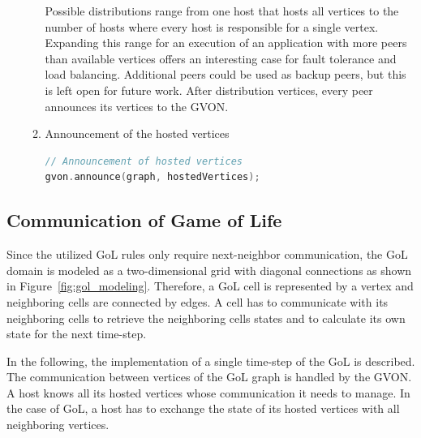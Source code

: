 \begin{enumerate}
\begin{enumerate}
  \noindent Possible distributions range from one host that hosts all
  vertices to the number of hosts where every host is responsible for
  a single vertex. Expanding this range for an execution of an
  application with more peers than available vertices offers an
  interesting case for fault tolerance and load balancing.  Additional
  peers could be used as backup peers, but this is left open for
  future work.  After distribution vertices, every peer announces its
  vertices to the GVON.

\item Announcement of the hosted vertices

  \begin{minipage}[t]{\textwidth} 
  \begin{lstlisting}[language=C++, label=lst:gol_announce, caption={}]
// Announcement of hosted vertices
gvon.announce(graph, hostedVertices);
  \end{lstlisting}
  \end{minipage}
  
  \end{enumerate}
\end{enumerate}

\subsection{Communication of Game of Life}
\label{sec:gol_imp}
Since the utilized GoL rules only require next-neighbor communication,
the GoL domain is modeled as a two-dimensional grid with diagonal
connections as shown in Figure~\ref{fig:gol_modeling}. Therefore, a
GoL cell is represented by a vertex and neighboring cells are
connected by edges. A cell has to communicate with its neighboring
cells to retrieve the neighboring cells states and to calculate its own
state for the next time-step.

In the following, the implementation of a single time-step of the GoL
is described. The communication between vertices of the GoL graph is
handled by the GVON. A host knows all its hosted vertices whose
communication it needs to manage. In the case of GoL, a host has to
exchange the state of its hosted vertices with all neighboring vertices.

